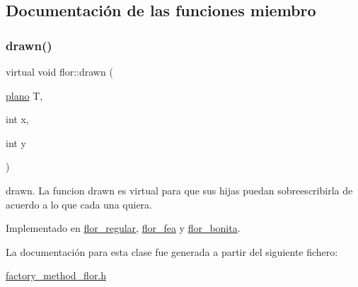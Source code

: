 \subsection{Documentación de las funciones miembro}
\mbox{\label{classflor_a5fd1bd8f51024b772a5da6c0f6c8e9e2}} 
\subsubsection{\texorpdfstring{drawn()}{drawn()}}
{\footnotesize\ttfamily virtual void flor\+::drawn (\begin{DoxyParamCaption}\item[{\hyperlink{classplano}{plano}}]{T,  }\item[{int}]{x,  }\item[{int}]{y }\end{DoxyParamCaption})\hspace{0.3cm}{\ttfamily [pure virtual]}}

drawn. La funcion drawn es virtual para que sus hijas puedan sobreescribirla de acuerdo a lo que cada una quiera. 

Implementado en \hyperlink{classflor__regular_a5805895cf36946a69173b64aaf504c58}{flor\+\_\+regular}, \hyperlink{classflor__fea_af4ee97eef5e4ac46e5fbafb737759c3b}{flor\+\_\+fea} y \hyperlink{classflor__bonita_a25162281fab0a1118962f1db69b4fa81}{flor\+\_\+bonita}.



La documentación para esta clase fue generada a partir del siguiente fichero\+:\begin{DoxyCompactItemize}
\item 
\hyperlink{factory__method__flor_8h}{factory\+\_\+method\+\_\+flor.\+h}\end{DoxyCompactItemize}
